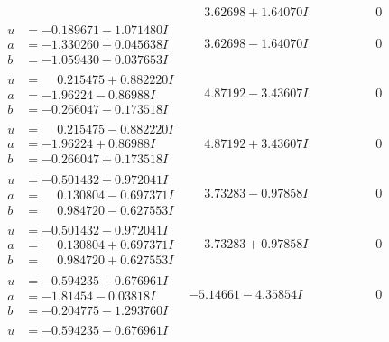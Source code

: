 \documentclass[1p]{elsarticle_modified}
\theoremstyle{definition}
\begin{document}
$$\begin{array}{c|c|c}
 & \phantom{-}3.62698 + 1.64070 I & \phantom{-0.000000 } 0 \\ \hline\begin{aligned}
u &= -0.189671 - 1.071480 I \\
a &= -1.330260 + 0.045638 I \\
b &= -1.059430 - 0.037653 I\end{aligned}
 & \phantom{-}3.62698 - 1.64070 I & \phantom{-0.000000 } 0 \\ \hline\begin{aligned}
u &= \phantom{-}0.215475 + 0.882220 I \\
a &= -1.96224 - 0.86988 I \\
b &= -0.266047 - 0.173518 I\end{aligned}
 & \phantom{-}4.87192 - 3.43607 I & \phantom{-0.000000 } 0 \\ \hline\begin{aligned}
u &= \phantom{-}0.215475 - 0.882220 I \\
a &= -1.96224 + 0.86988 I \\
b &= -0.266047 + 0.173518 I\end{aligned}
 & \phantom{-}4.87192 + 3.43607 I & \phantom{-0.000000 } 0 \\ \hline\begin{aligned}
u &= -0.501432 + 0.972041 I \\
a &= \phantom{-}0.130804 - 0.697371 I \\
b &= \phantom{-}0.984720 - 0.627553 I\end{aligned}
 & \phantom{-}3.73283 - 0.97858 I & \phantom{-0.000000 } 0 \\ \hline\begin{aligned}
u &= -0.501432 - 0.972041 I \\
a &= \phantom{-}0.130804 + 0.697371 I \\
b &= \phantom{-}0.984720 + 0.627553 I\end{aligned}
 & \phantom{-}3.73283 + 0.97858 I & \phantom{-0.000000 } 0 \\ \hline\begin{aligned}
u &= -0.594235 + 0.676961 I \\
a &= -1.81454 - 0.03818 I \\
b &= -0.204775 - 1.293760 I\end{aligned}
 & -5.14661 - 4.35854 I & \phantom{-0.000000 } 0 \\ \hline\begin{aligned}
u &= -0.594235 - 0.676961 I \\

\end{aligned}
\end{array}$$
\end{document}

